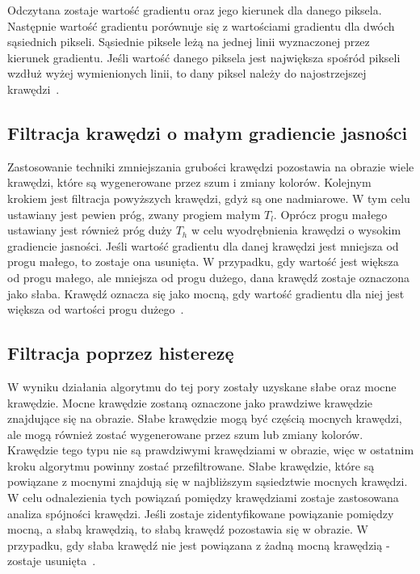 \documentclass[a4paper,twoside,12pt]{book}
\begin{document}
    Odczytana zostaje wartość gradientu oraz jego kierunek dla danego piksela.
    Następnie wartość gradientu porównuje się z wartościami gradientu dla
    dwóch sąsiednich pikseli.
    Sąsiednie piksele leżą na jednej linii wyznaczonej przez kierunek gradientu.
    Jeśli wartość danego piksela jest największa spośród pikseli wzdłuż wyżej wymienionych linii,
    to dany piksel należy do najostrzejszej krawędzi~\cite{Canny}.

    \subsection*{Filtracja krawędzi o małym gradiencie
    jasności}\label{subsec:filtracja-krawędzi-o-małym-gradiencie-jasności}
    Zastosowanie techniki zmniejszania grubości krawędzi pozostawia na obrazie wiele krawędzi, które są wygenerowane przez szum i zmiany
    kolorów.
    Kolejnym krokiem jest filtracja powyższych krawędzi, gdyż są one nadmiarowe.
    W tym celu ustawiany jest pewien próg, zwany progiem małym $T_{l}$.
    Oprócz progu małego ustawiany jest również próg duży $T_{h}$ w celu wyodrębnienia krawędzi o wysokim gradiencie
    jasności.
    Jeśli wartość gradientu dla danej krawędzi jest mniejsza od progu małego, to zostaje ona usunięta.
    W przypadku, gdy wartość jest większa od progu małego, ale mniejsza od progu dużego, dana krawędź
    zostaje oznaczona jako słaba.
    Krawędź oznacza się jako mocną, gdy wartość gradientu dla niej jest większa od wartości progu dużego~\cite{Canny}.

    \subsection*{Filtracja poprzez histerezę}\label{subsec:filtracja-poprzez-histerezę}
    W wyniku działania algorytmu do tej pory zostały uzyskane słabe oraz mocne krawędzie.
    Mocne krawędzie zostaną oznaczone jako prawdziwe krawędzie znajdujące się na obrazie.
    Słabe krawędzie mogą być częścią mocnych krawędzi, ale
    mogą również zostać wygenerowane przez szum lub zmiany kolorów.
    Krawędzie tego typu nie są prawdziwymi krawędziami w obrazie, więc w ostatnim kroku algorytmu powinny zostać
    przefiltrowane.
    Słabe krawędzie, które są powiązane z mocnymi znajdują się w najbliższym sąsiedztwie mocnych krawędzi.
    W celu odnalezienia tych powiązań pomiędzy krawędziami zostaje zastosowana analiza spójności krawędzi.
    Jeśli zostaje zidentyfikowane powiązanie pomiędzy mocną, a słabą krawędzią, to słabą krawędź pozostawia się w obrazie.
    W przypadku, gdy słaba krawędź nie jest powiązana z żadną mocną krawędzią - zostaje usunięta~\cite{Canny}.
\end{document}
